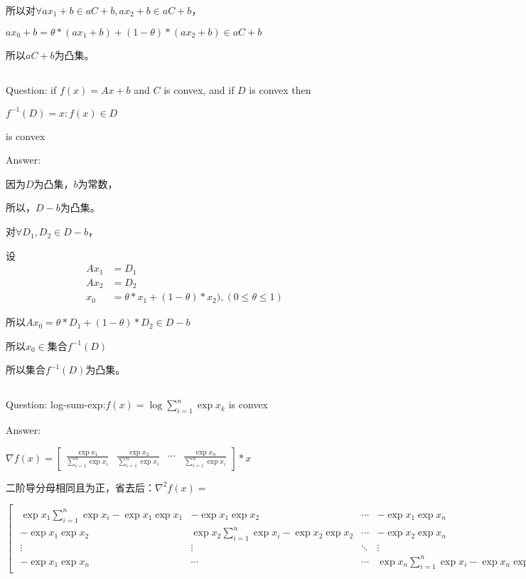 \documentclass[UTF8]{ctexart}
\begin{document}
所以对$\forall ax_1 + b \in aC + b,ax_2 + b \in aC + b$，

$ax_0 + b = \theta * (ax_1 + b) + (1 - \theta) * (ax_2 + b) \in aC + b$

所以$aC + b$为凸集。
\subsection{}
Question:
if $f(x) = Ax + b$ and $C$ is convex,
and if $D$ is convex then
\begin{center}
$f^{-1}(D) = {x:f(x) \in D}$
\end{center}
is convex

Answer:

因为$D$为凸集，$b$为常数，

所以，$D - b$为凸集。

对$\forall D_1,D_2 \in D - b$，

设
\begin{align}\nonumber
Ax_1 &= D_1\\
\nonumber Ax_2 &= D_2\\
\nonumber x_0 &= \theta * x_1 + (1 - \theta ) * x_2), (0 \leq \theta \leq 1)
\end{align}

所以$Ax_0 = \theta * D_1 + (1 - \theta) * D_2 \in D - b$

所以$x_0 \in$集合$f^{-1}(D)$

所以集合$f^{-1}(D)$为凸集。

\subsection{}
Question:
log-sum-exp:$f(x) = \log{\sum_{i=1}^n \exp{x_k}}$ is convex

Answer:
\begin{center}
$\nabla f(x) = \begin{bmatrix}
\frac{\exp x_1}{\sum_{i=1}^n \exp x_i}&\frac{\exp x_2}{\sum_{i=1}^n \exp x_i}&\cdots&\frac{\exp x_n}{\sum_{i=1}^n \exp x_i}
\end{bmatrix} * x$
\end{center}

二阶导分母相同且为正，省去后：$\nabla^2 f(x) =$
\begin{center}$ \begin{bmatrix} \begin{smallmatrix}
\exp x_1\sum_{i=1}^n \exp x_i - \exp x_1\exp x_1  &  -\exp x_1\exp x_2 & \cdots & -\exp x_1\exp x_n \\
 -\exp x_1\exp x_2 & \exp x_2\sum_{i=1}^n \exp x_i - \exp x_2\exp x_2 & \cdots & -\exp x_2\exp x_n \\
 \vdots   & \vdots & \ddots  & \vdots  \\
-\exp x_1\exp x_n &   \cdots &\cdots  &\exp x_n\sum_{i=1}^n \exp x_i - \exp x_n\exp x_n    
\end{smallmatrix} \end{bmatrix}$
\end{center}
\end{document}
